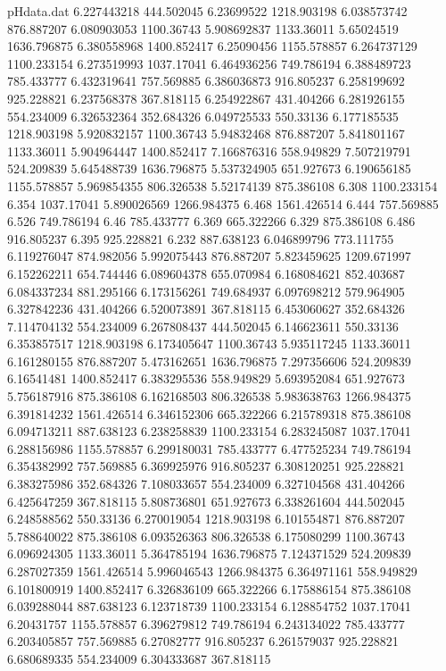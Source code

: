 \begin{filecontents}{pHdata.dat}
6.227443218	444.502045
6.23699522	1218.903198
6.038573742	876.887207
6.080903053	1100.36743
5.908692837	1133.36011
5.65024519	1636.796875
6.380558968	1400.852417
6.25090456	1155.578857
6.264737129	1100.233154
6.273519993	1037.17041
6.464936256	749.786194
6.388489723	785.433777
6.432319641	757.569885
6.386036873	916.805237
6.258199692	925.228821
6.237568378	367.818115
6.254922867	431.404266
6.281926155	554.234009
6.326532364	352.684326
6.049725533	550.33136
6.177185535	1218.903198
5.920832157	1100.36743
5.94832468	876.887207
5.841801167	1133.36011
5.904964447	1400.852417
7.166876316	558.949829
7.507219791	524.209839
5.645488739	1636.796875
5.537324905	651.927673
6.190656185	1155.578857
5.969854355	806.326538
5.52174139	875.386108
6.308	1100.233154
6.354	1037.17041
5.890026569	1266.984375
6.468	1561.426514
6.444	757.569885
6.526	749.786194
6.46	785.433777
6.369	665.322266
6.329	875.386108
6.486	916.805237
6.395	925.228821
6.232	887.638123
6.046899796	773.111755
6.119276047	874.982056
5.992075443	876.887207
5.823459625	1209.671997
6.152262211	654.744446
6.089604378	655.070984
6.168084621	852.403687
6.084337234	881.295166
6.173156261	749.684937
6.097698212	579.964905
6.327842236	431.404266
6.520073891	367.818115
6.453060627	352.684326
7.114704132	554.234009
6.267808437	444.502045
6.146623611	550.33136
6.353857517	1218.903198
6.173405647	1100.36743
5.935117245	1133.36011
6.161280155	876.887207
5.473162651	1636.796875
7.297356606	524.209839
6.16541481	1400.852417
6.383295536	558.949829
5.693952084	651.927673
5.756187916	875.386108
6.162168503	806.326538
5.983638763	1266.984375
6.391814232	1561.426514
6.346152306	665.322266
6.215789318	875.386108
6.094713211	887.638123
6.238258839	1100.233154
6.283245087	1037.17041
6.288156986	1155.578857
6.299180031	785.433777
6.477525234	749.786194
6.354382992	757.569885
6.369925976	916.805237
6.308120251	925.228821
6.383275986	352.684326
7.108033657	554.234009
6.327104568	431.404266
6.425647259	367.818115
5.808736801	651.927673
6.338261604	444.502045
6.248588562	550.33136
6.270019054	1218.903198
6.101554871	876.887207
5.788640022	875.386108
6.093526363	806.326538
6.175080299	1100.36743
6.096924305	1133.36011
5.364785194	1636.796875
7.124371529	524.209839
6.287027359	1561.426514
5.996046543	1266.984375
6.364971161	558.949829
6.101800919	1400.852417
6.326836109	665.322266
6.175886154	875.386108
6.039288044	887.638123
6.123718739	1100.233154
6.128854752	1037.17041
6.20431757	1155.578857
6.396279812	749.786194
6.243134022	785.433777
6.203405857	757.569885
6.27082777	916.805237
6.261579037	925.228821
6.680689335	554.234009
6.304333687	367.818115

\end{filecontents}
